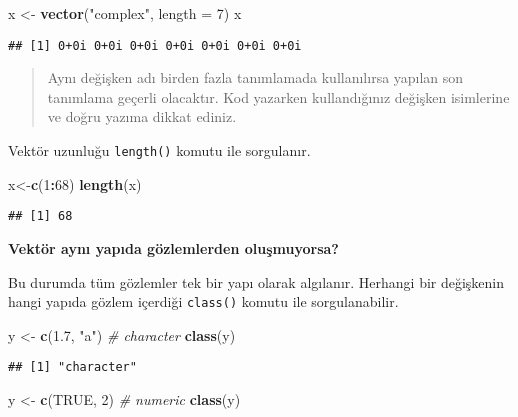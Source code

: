 \documentclass[
]{book}
\newenvironment{Shaded}{\begin{snugshade}}{\end{snugshade}}
\newcommand{\CommentTok}[1]{\textcolor[rgb]{0.56,0.35,0.01}{\textit{#1}}}
\newcommand{\DataTypeTok}[1]{\textcolor[rgb]{0.13,0.29,0.53}{#1}}
\newcommand{\DecValTok}[1]{\textcolor[rgb]{0.00,0.00,0.81}{#1}}
\newcommand{\FloatTok}[1]{\textcolor[rgb]{0.00,0.00,0.81}{#1}}
\newcommand{\KeywordTok}[1]{\textcolor[rgb]{0.13,0.29,0.53}{\textbf{#1}}}
\newcommand{\NormalTok}[1]{#1}
\newcommand{\OperatorTok}[1]{\textcolor[rgb]{0.81,0.36,0.00}{\textbf{#1}}}
\newcommand{\OtherTok}[1]{\textcolor[rgb]{0.56,0.35,0.01}{#1}}
\newcommand{\StringTok}[1]{\textcolor[rgb]{0.31,0.60,0.02}{#1}}
\begin{document}
\begin{Shaded}
\begin{Highlighting}[]
\NormalTok{x <-}\StringTok{ }\KeywordTok{vector}\NormalTok{(}\StringTok{"complex"}\NormalTok{, }\DataTypeTok{length =} \DecValTok{7}\NormalTok{)}
\NormalTok{x}
\end{Highlighting}
\end{Shaded}

\begin{verbatim}
## [1] 0+0i 0+0i 0+0i 0+0i 0+0i 0+0i 0+0i
\end{verbatim}

\begin{quote}
Aynı değişken adı birden fazla tanımlamada kullanılırsa yapılan son tanımlama geçerli olacaktır. Kod yazarken kullandığınız değişken isimlerine ve doğru yazıma dikkat ediniz.
\end{quote}

Vektör uzunluğu \texttt{length()} komutu ile sorgulanır.

\begin{Shaded}
\begin{Highlighting}[]
\NormalTok{x<-}\KeywordTok{c}\NormalTok{(}\DecValTok{1}\OperatorTok{:}\DecValTok{68}\NormalTok{)}
\KeywordTok{length}\NormalTok{(x)}
\end{Highlighting}
\end{Shaded}

\begin{verbatim}
## [1] 68
\end{verbatim}

\textbf{Vektör aynı yapıda gözlemlerden oluşmuyorsa?}

Bu durumda tüm gözlemler tek bir yapı olarak algılanır. Herhangi bir değişkenin hangi yapıda gözlem içerdiği \texttt{class()} komutu ile sorgulanabilir.

\begin{Shaded}
\begin{Highlighting}[]
\NormalTok{y <-}\StringTok{ }\KeywordTok{c}\NormalTok{(}\FloatTok{1.7}\NormalTok{, }\StringTok{"a"}\NormalTok{)  }\CommentTok{# character }
\KeywordTok{class}\NormalTok{(y)}
\end{Highlighting}
\end{Shaded}

\begin{verbatim}
## [1] "character"
\end{verbatim}

\begin{Shaded}
\begin{Highlighting}[]
\NormalTok{y <-}\StringTok{ }\KeywordTok{c}\NormalTok{(}\OtherTok{TRUE}\NormalTok{, }\DecValTok{2}\NormalTok{) }\CommentTok{# numeric}
\KeywordTok{class}\NormalTok{(y)}
\end{Highlighting}
\end{Shaded}
\end{document}
